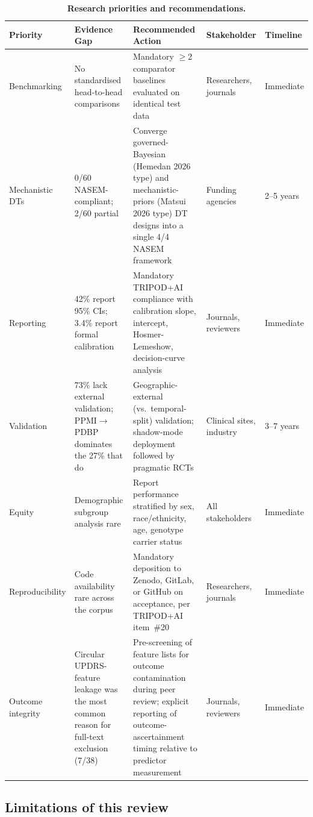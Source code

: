 \begin{table}[H]
\centering
\caption{\textbf{Research priorities and recommendations.}}
\label{sr:tab:priorities}
\small
\begin{tabularx}{\textwidth}{@{}lXXll@{}}
\toprule
\textbf{Priority} & \textbf{Evidence Gap} & \textbf{Recommended Action} & \textbf{Stakeholder} & \textbf{Timeline} \\
\midrule
Benchmarking & No standardised head-to-head comparisons & Mandatory $\geq$2 comparator baselines evaluated on identical test data & Researchers, journals & Immediate \\
Mechanistic DTs & 0/60 NASEM-compliant; 2/60 partial & Converge governed-Bayesian (Hemedan 2026 type) and mechanistic-priors (Matsui 2026 type) DT designs into a single 4/4 NASEM framework & Funding agencies & 2--5 years \\
Reporting & 42\% report 95\% CIs; 3.4\% report formal calibration & Mandatory TRIPOD+AI~\cite{collins2024} compliance with calibration slope, intercept, Hosmer-Lemeshow, decision-curve analysis & Journals, reviewers & Immediate \\
Validation & 73\% lack external validation; PPMI$\rightarrow$PDBP dominates the 27\% that do & Geographic-external (vs.\ temporal-split) validation; shadow-mode deployment followed by pragmatic RCTs & Clinical sites, industry & 3--7 years \\
Equity & Demographic subgroup analysis rare & Report performance stratified by sex, race/ethnicity, age, genotype carrier status & All stakeholders & Immediate \\
Reproducibility & Code availability rare across the corpus & Mandatory deposition to Zenodo, GitLab, or GitHub on acceptance, per TRIPOD+AI item~\#20 & Researchers, journals & Immediate \\
Outcome integrity & Circular UPDRS-feature leakage was the most common reason for full-text exclusion (7/38) & Pre-screening of feature lists for outcome contamination during peer review; explicit reporting of outcome-ascertainment timing relative to predictor measurement & Journals, reviewers & Immediate \\
\bottomrule
\end{tabularx}
\end{table}

\subsection{Limitations of this review}
\label{sr:sec:discussion:limitations}

